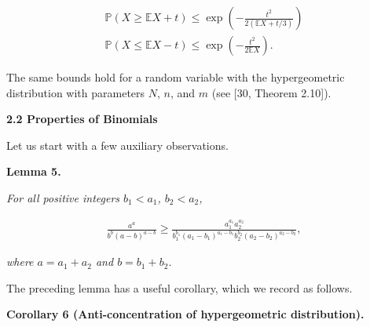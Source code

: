\documentclass[10pt,a4paper]{article}
\begin{document}
\[\begin{gathered}
\displaystyle\mathbb{P}(X\geq\mathbb{E}X+t) \displaystyle\leq \displaystyle\exp\left(-\frac{t^{2}}{2(\mathbb{E}X+t/3)}\right) \\
\displaystyle\mathbb{P}(X\leq\mathbb{E}X-t) \displaystyle\leq \displaystyle\exp\left(-\frac{t^{2}}{2\mathbb{E}X}\right).
\end{gathered}\]


The same bounds hold for a random variable with the hypergeometric distribution with parameters $N$, $n$, and $m$ (see [30, Theorem 2.10]).\par





\par\medskip\noindent\textbf{
2.2 Properties of Binomials}\par




Let us start with a few auxiliary observations.\par





\par\medskip\noindent\textbf{
\textbf{Lemma 5}\textbf{.}
}\par



\emph{For all positive integers $b_{1}<a_{1}$, $b_{2}<a_{2}$,}\par


\[\begin{gathered}
\frac{a^{a}}{b^{b}(a-b)^{a-b}}\geq\frac{a_{1}^{a_{1}}a_{2}^{a_{2}}}{b_{1}^{b_{1}}(a_{1}-b_{1})^{a_{1}-b_{1}}b_{2}^{b_{2}}(a_{2}-b_{2})^{a_{2}-b_{2}}},
\end{gathered}\]


\emph{where $a=a_{1}+a_{2}$ and $b=b_{1}+b_{2}$.}\par






The preceding lemma has a useful corollary, which we record as follows.\par





\par\medskip\noindent\textbf{
\textbf{Corollary 6}\textbf{ }(Anti-concentration of hypergeometric distribution)\textbf{.}
}\par
\end{document}

